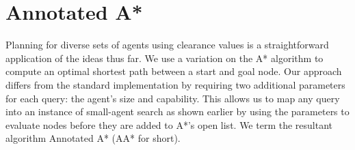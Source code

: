 \section{Annotated A*}
\label{aha:aastar}
Planning for diverse sets of agents using clearance values is a straightforward application of the ideas thus far.
We use a variation on the A* algorithm \cite{astar} to compute an optimal shortest path between a start and goal node.  
Our approach differs from the standard implementation by requiring two additional parameters for each query: the agent's size and capability. This allows us to map any query into an instance of small-agent search as shown earlier by using the parameters to evaluate nodes before they are added to A*'s open list. We term the resultant algorithm Annotated A* (AA* for short).
